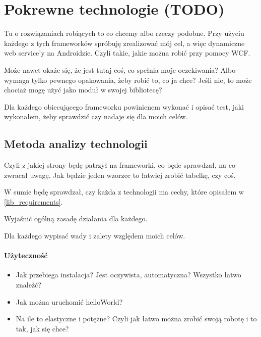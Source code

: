 \chapter{Pokrewne technologie (TODO)}
Tu o rozwiązaniach robiących to co chcemy albo rzeczy podobne. Przy użyciu każdego z tych frameworków spróbuję zrealizować mój cel, a więc dynamiczne web service'y na Androidzie. Czyli takie, jakie można robić przy pomocy WCF.

Może nawet okaże się, że jest tutaj coś, co spełnia moje oczekiwania? Albo wymaga tylko pewnego opakowania, żeby robić to, co ja chce?
Jeśli nie, to może chociaż mogę użyć jako moduł w swojej bibliotecę?

Dla każdego obiecującego frameworku powinienem wykonać i opisać test, jaki wykonałem, żeby sprawdzić czy nadaje się dla moich celów.



\section{Metoda analizy technologii}
Czyli z jakiej strony będę patrzył na frameworki, co będe sprawdzał, na co zwracał uwagę. Jak będzie jeden wzorzec to łatwiej zrobić tabelkę, czy coś.

W sumie będę sprawdzał, czy każda z technologii ma cechy, które opisałem w \ref{lib_requirements}.

Wyjaśnić ogólną zasadę działania dla każdego.

Dla każdego wypisać wady i zalety względem moich celów.

\subsubsection{Użyteczność}
\begin{itemize}
	\item Jak przebiega instalacja? Jest oczywista, automatyczna? Wszystko łatwo znaleźć?
	\item Jak można uruchomić helloWorld?
	\item Na ile to elastyczne i potężne? Czyli jak łatwo można zrobić swoją robotę i to tak, jak się chce?
\end{itemize}

